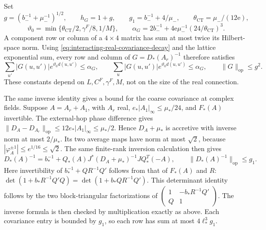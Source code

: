 Set
\[
 g=(b_-^{-1}+\mu_-^{-1})^{1/2},\qquad
 h_G=1+g,\qquad g_1=b_-^{-1}+4/\mu_-,
 \qquad \theta_{\mathrm{CT}}=\mu_-/(12\mathrm e),
\]
\[
 \vartheta_0=\min\{\theta_{\mathrm{CT}}/2,\gamma^F/8,1/M\},
 \qquad
 \alpha_G=2b_-^{-1}
        +4\mathrm e\mu_-^{-1}(24/\theta_{\mathrm{CT}})^3.
\]
A component row or column of a $4\times4$ matrix
has sum at most twice its Hilbert-space norm.
Using \eqref{eq:interacting-real-covariance-decay}
and the lattice exponential sum, every row and
column of $G=D_*(A_r)^{-1}$ therefore satisfies
\begin{equation}\label{eq:interacting-Gaussian-covariance}
 \sum_{u'}|G(u,u')|e^{\vartheta_0d(u,u')}
       \le\alpha_G,\qquad
 \sum_u|G(u,u')|e^{\vartheta_0d(u,u')}
       \le\alpha_G,\qquad \|G\|_{\mathrm{op}}\le g^2.
\end{equation}
These constants depend on $L,C^F,\gamma^F,M$,
not on the size of the real connection.

The same inverse identity gives a bound for the
coarse covariance at complex fields. Suppose
$A=A_r+A_1$, with $A_r$ real,
$e_*|A_1|_\infty\le\mu_*/24$, and $F_*(A)$
invertible. The external-hop phase difference
gives $\|D_A-D_{A_r}\|_{\mathrm{op}}\le12e_*|A_1|_\infty
\le\mu_*/2$. Hence $D_A+\mu_*$ is accretive
with inverse norm at most $2/\mu_*$. Its two
average maps have norm at most $\sqrt2$,
because $|\varphi_A^{\pm1}|\le e^{1/16}\le\sqrt2$.
The same finite-rank inversion calculation
then gives
\begin{equation}\label{eq:interacting-complex-covariance}
 D_*(A)^{-1}=b_*^{-1}+
 Q_*(A)J^*(D_A+\mu_*)^{-1}JQ_*^T(-A),
 \qquad
 \|D_*(A)^{-1}\|_{\mathrm{op}}\le g_1.
\end{equation}
Here invertibility of $b_*^{-1}+QR^{-1}Q'$
follows from that of $F_*(A)$ and $R$:
$\det(1+b_*R^{-1}Q'Q)=\det(1+b_*QR^{-1}Q')$.
This determinant identity follows by the two
block-triangular factorizations of
$\left(\begin{smallmatrix}1&-b_*R^{-1}Q'\\Q&1\end{smallmatrix}\right)$.
The inverse formula is then checked by
multiplication exactly as above.
Each covariance entry is bounded by $g_1$,
so each row has sum at most $4\ell_*^3g_1$.


\printbibliography

